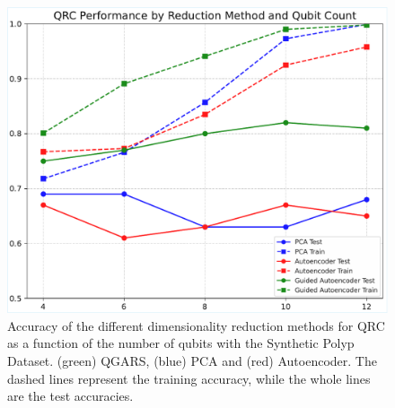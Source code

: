 \documentclass[conference]{IEEEtran}
\begin{document}
\begin{figure}[!t]
    \centering
    \includegraphics[width=\linewidth]{images/results/generated_polyp_dataset/n_qubit_qrc_performance_by_reduction_method.pdf} 
    \caption{Accuracy of the different dimensionality reduction methods for QRC as a function of the number of qubits with the Synthetic Polyp Dataset. (green) QGARS, (blue) PCA and (red) Autoencoder. The dashed lines represent the training accuracy, while the whole lines are the test accuracies.}
    \label{fig:n_qubits_accuracy}
\end{figure}
\end{document}
